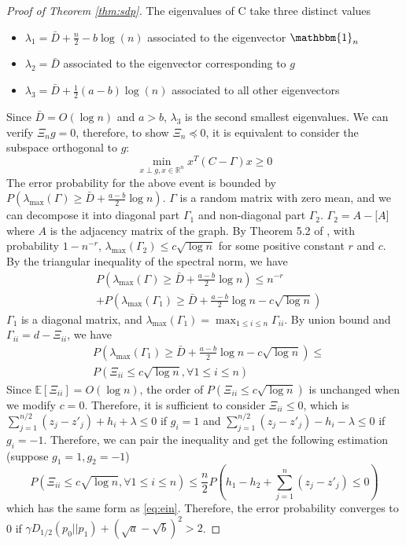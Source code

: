 \documentclass[conference]{IEEEtran}
\begin{document}
\begin{proof}[Proof of Theorem \ref{thm:sdp}]
The eigenvalues of C take three distinct values
\begin{itemize}
	\item $\lambda_1=\bar{D}+\frac{n}{2}-b \log(n)$ associated to the eigenvector $\mathbbm{1}_n$
	\item $\lambda_2=\bar{D}$ associated to the eigenvector corresponding to  $g$
	\item $\lambda_3=\bar{D}+\frac{1}{2}(a-b)\log(n)$ associated to all other eigenvectors
\end{itemize}
Since $\bar{D}=O(\log n)$ and $a>b$, $\lambda_3$ is the second smallest eigenvalues.
We can verify $\Xi_n g = 0$, therefore, to show $\Xi_n \preceq 0$, it is equivalent
to consider the subspace orthogonal to $g$:
$$
\min_{x \perp g, x \in \mathbb{R}^n } x^T (C-\Gamma) x \geq 0
$$
The error probability for the above event is bounded by
$P(\lambda_{\max}(\Gamma) \geq \bar{D}+\frac{a-b}{2}\log n)$.
$\Gamma$ is a random matrix with zero mean, and we can decompose it into diagonal part
$\Gamma_1$ and non-diagonal part $\Gamma_2$. $\Gamma_2=A-\mathbb[A]$
where $A$ is the adjacency matrix of the graph. By Theorem 5.2 of \cite{lei2015consistency},
with probability $1-n^{-r}$, $\lambda_{\max}(\Gamma_2) \leq c\sqrt{\log n}$ for some positive constant $r$ and $c$. By the triangular inequality of the spectral norm, we have
\begin{align*}
&P(\lambda_{\max}(\Gamma) \geq  \bar{D}+\frac{a-b}{2}\log n)
\leq n^{-r}  \\
& + P(\lambda_{\max}(\Gamma_1) \geq \bar{D}+\frac{a-b}{2}\log n - c\sqrt{\log n})
\end{align*}
$\Gamma_1$ is a diagonal matrix, and $\lambda_{\max}(\Gamma_1) = \max_{1\leq i \leq n} \Gamma_{ii}$.
By union bound and $\Gamma_{ii} = d - \Xi_{ii}$, we have
\begin{align*}
&P(\lambda_{\max}(\Gamma_1) \geq \bar{D}+\frac{a-b}{2}\log n - c\sqrt{\log n})\leq \\
&P(\Xi_{ii} \leq c\sqrt{\log n}, \forall 1\leq i \leq n)
\end{align*}
Since $\mathbb{E}[\Xi_{ii}]=O(\log n)$, the order of $P(\Xi_{ii} \leq c\sqrt{\log n})$ is unchanged when we modify $c=0$. Therefore, it is sufficient to consider $\Xi_{ii} \leq 0 $, which is
$\sum_{j=1}^{n/2} (z_j - z'_j) + h_i + \lambda \leq 0$ if $g_i=1$ and
$\sum_{j=1}^{n/2} (z_j - z'_j) - h_i - \lambda \leq 0$ if $g_i = -1$.
Therefore, we can pair the inequality and get the following estimation (suppose $g_1=1, g_2=-1$)
$$
P(\Xi_{ii} \leq c\sqrt{\log n}, \forall 1\leq i \leq n)
\leq \frac{n}{2} P(h_1 - h_2 + \sum_{j=1}^n (z_j - z'_j) \leq 0)
$$
which has the same form as \eqref{eq:ein}. Therefore, the error probability converges to 0
if $\gamma D_{1/2}(p_0||p_1) + (\sqrt{a} - \sqrt{b})^2 > 2$.

\end{proof}



\end{document}
